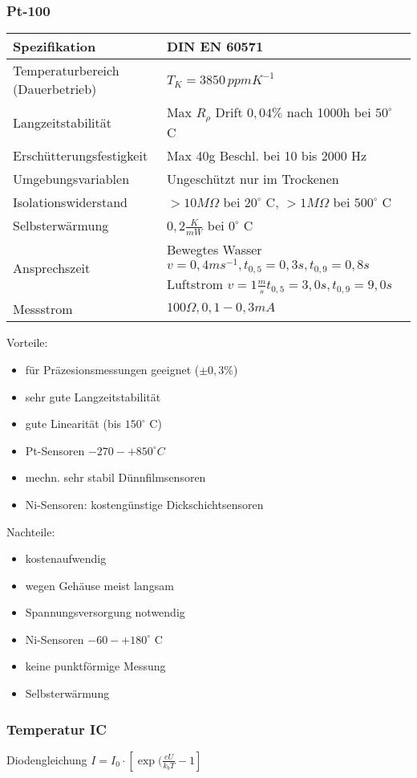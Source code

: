 \documentclass[a4paper]{scrartcl}
\begin{document}
\subsubsection{Pt-100}
\begin{tabular}{l|l}
Spezifikation & DIN EN 60571 \\ \hline
Temperaturbereich (Dauerbetrieb) & $T_K = 3850 \, ppmK^{-1}$\\
Langzeitstabilität & Max $R_\rho$ Drift $ 0,04 \%$ nach 1000h bei $50^\circ $ C \\
Erschütterungsfestigkeit & Max 40g Beschl. bei 10 bis 2000 Hz\\
Umgebungsvariablen & Ungeschützt nur im Trockenen\\
Isolationswiderstand & $> 10 M \Omega$ bei $20^\circ$ C, $> 1 M \Omega$  bei $500^\circ$ C\\
Selbsterwärmung & $0,2 \frac{K}{mW}$ bei $0^\circ$ C\\
Ansprechszeit & Bewegtes Wasser $v=0,4 ms^{-1}, t_{0,5} = 0,3s, t_{0,9} = 0,8s$ Luftstrom $v=1\frac{m}{s} t_{0,5} = 3,0s , t_{0,9} = 9,0s$\\
Messstrom & $100 \Omega, 0,1-0,3 mA$\\
\end{tabular}

Vorteile:
\begin{itemize}
\item für Präzesionsmessungen geeignet ($\pm 0,3 \%$)
\item sehr gute Langzeitstabilität
\item gute Linearität (bis $150^\circ$ C)
\item Pt-Sensoren $-270 - +850^\circ C$
\item mechn. sehr stabil Dünnfilmsensoren
\item Ni-Sensoren: kostengünstige Dickschichtsensoren
\end{itemize}

Nachteile:
\begin{itemize}
\item kostenaufwendig
\item wegen Gehäuse meist langsam
\item Spannungsversorgung notwendig
\item Ni-Sensoren $-60 - +180^\circ$ C
\item keine punktförmige Messung
\item Selbsterwärmung
\end{itemize}

\subsubsection{Temperatur IC}
Diodengleichung $I = I_0 \cdot [ \exp{(\frac{eU}{k_bT} -1} ] $
\end{document}
